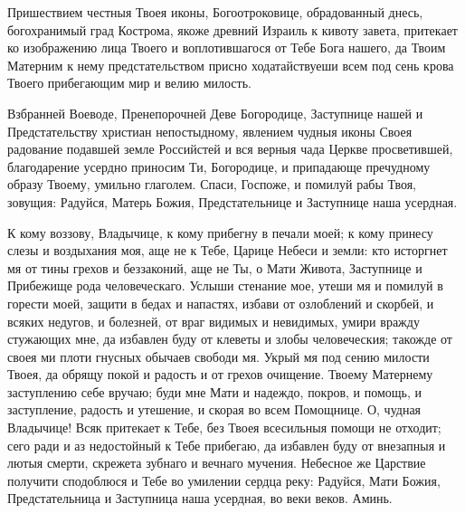 \begin{mymulticols}

\vspace{-\baselineskip}


Пришествием честныя Твоея иконы, Богоотроковице, обрадованный днесь, богохранимый град Кострома, якоже древний Израиль к кивоту завета, притекает ко изображению лица Твоего и воплотившагося от Тебе Бога нашего, да Твоим Матерним к нему предстательством присно ходатайствуеши всем под сень крова Твоего прибегающим мир и велию милость.


Взбранней Воеводе, Пренепорочней Деве Богородице, Заступнице нашей и Предстательству христиан непостыдному, явлением чудныя иконы Своея радование подавшей земле Российстей и вся верныя чада Церкве просветившей, благодарение усердно приносим Ти, Богородице, и припадающе пречудному образу Твоему, умильно глаголем. Спаси, Госпоже, и помилуй рабы Твоя, зовущия: Радуйся, Матерь Божия, Предстательнице и Заступнице наша усердная.


К кому воззову, Владычице, к кому прибегну в печали моей; к кому принесу слезы и воздыхания моя, аще не к Тебе, Царице Небеси и земли: кто исторгнет мя от тины грехов и беззаконий, аще не Ты, о Мати Живота, Заступнице и Прибежище рода человеческаго. Услыши стенание мое, утеши мя и помилуй в горести моей, защити в бедах и напастях, избави от озлоблений и скорбей, и всяких недугов, и болезней, от враг видимых и невидимых, умири вражду стужающих мне, да избавлен буду от клеветы и злобы человеческия; такожде от своея ми плоти гнусных обычаев свободи мя. Укрый мя под сению милости Твоея, да обрящу покой и радость и от грехов очищение. Твоему Матернему заступлению себе вручаю; буди мне Мати и надеждо, покров, и помощь, и заступление, радость и утешение, и скорая во всем Помощнице. О, чудная Владычице! Всяк притекает к Тебе, без Твоея всесильныя помощи не отходит; сего ради и аз недостойный к Тебе прибегаю, да избавлен буду от внезапныя и лютыя смерти, скрежета зубнаго и вечнаго мучения. Небесное же Царствие получити сподоблюся и Тебе во умилении сердца реку: Радуйся, Мати Божия, Предстательница и Заступница наша усердная, во веки веков. Аминь.

\end{mymulticols}


